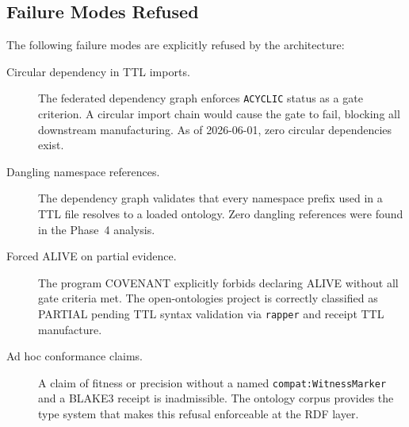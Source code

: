 \subsection{Failure Modes Refused}
\label{sec:research-open-ontologies-failure-modes}

The following failure modes are explicitly refused by the architecture:

\begin{description}
  \item[Circular dependency in TTL imports.] The federated dependency graph enforces
        \texttt{ACYCLIC} status as a gate criterion. A circular import chain would cause
        the gate to fail, blocking all downstream manufacturing. As of 2026-06-01, zero
        circular dependencies exist.
  \item[Dangling namespace references.] The dependency graph validates that every namespace
        prefix used in a TTL file resolves to a loaded ontology. Zero dangling references
        were found in the Phase~4 analysis.
  \item[Forced ALIVE on partial evidence.] The program COVENANT explicitly forbids declaring
        ALIVE without all gate criteria met. The open-ontologies project is correctly
        classified as PARTIAL pending TTL syntax validation via \texttt{rapper} and receipt
        TTL manufacture.
  \item[Ad hoc conformance claims.] A claim of fitness or precision without a named
        \texttt{compat:WitnessMarker} and a BLAKE3 receipt is inadmissible. The ontology
        corpus provides the type system that makes this refusal enforceable at the RDF layer.
\end{description}
